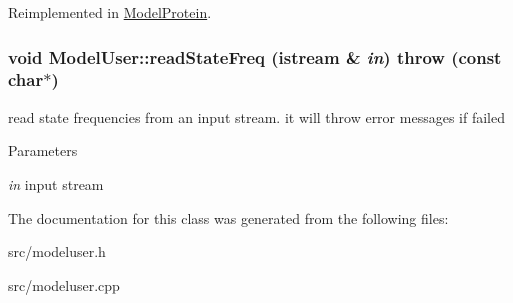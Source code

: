Reimplemented in \hyperlink{classModelProtein_a4809c8c2aaa4e5d976214034b3b94df3}{ModelProtein}.\hypertarget{classModelUser_a9f0085e7db330321824bf0ccce250bd5}{
\subsubsection[{readStateFreq}]{\setlength{\rightskip}{0pt plus 5cm}void ModelUser::readStateFreq (istream \& {\em in})  throw (const char$\ast$)}}
\label{classModelUser_a9f0085e7db330321824bf0ccce250bd5}
read state frequencies from an input stream. it will throw error messages if failed 
\begin{DoxyParams}{Parameters}
\item[{\em in}]input stream \end{DoxyParams}


The documentation for this class was generated from the following files:\begin{DoxyCompactItemize}
\item 
src/modeluser.h\item 
src/modeluser.cpp\end{DoxyCompactItemize}
